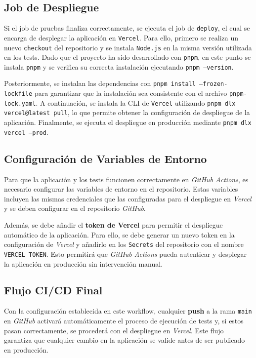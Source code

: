 \subsection*{Job de Despliegue}

Si el job de pruebas finaliza correctamente, se ejecuta el job de \texttt{deploy}, el cual se encarga de desplegar la aplicación en \texttt{Vercel}. Para ello, primero se realiza un nuevo \texttt{checkout} del repositorio y se instala \texttt{Node.js} en la misma versión utilizada en los tests. Dado que el proyecto ha sido desarrollado con \texttt{pnpm}, en este punto se instala \texttt{pnpm} y se verifica su correcta instalación ejecutando \texttt{pnpm --version}.

Posteriormente, se instalan las dependencias con \texttt{pnpm install --frozen-lockfile} para garantizar que la instalación sea consistente con el archivo \texttt{pnpm-lock.yaml}. A continuación, se instala la CLI de \texttt{Vercel} utilizando \texttt{pnpm dlx vercel@latest pull}, lo que permite obtener la configuración de despliegue de la aplicación. Finalmente, se ejecuta el despliegue en producción mediante \texttt{pnpm dlx vercel --prod}.

\subsection{Configuración de Variables de Entorno}

Para que la aplicación y los tests funcionen correctamente en \textit{GitHub Actions}, es necesario configurar las variables de entorno en el repositorio. Estas variables incluyen las mismas credenciales que las configuradas para el despliegue en \textit{Vercel} y se deben configurar en el repositorio \textit{GitHub}.

Además, se debe añadir el \textbf{token de Vercel} para permitir el despliegue automático de la aplicación. Para ello, se debe generar un nuevo token en la configuración de \textit{Vercel} y añadirlo en los \texttt{Secrets} del repositorio con el nombre \texttt{VERCEL\_TOKEN}. Esto permitirá que \textit{GitHub Actions} pueda autenticar y desplegar la aplicación en producción sin intervención manual.

\subsection{Flujo CI/CD Final}

Con la configuración establecida en este workflow, cualquier \textbf{push} a la rama \texttt{main} en \textit{GitHub} activará automáticamente el proceso de ejecución de tests y, si estos pasan correctamente, se procederá con el despliegue en \textit{Vercel}. Este flujo garantiza que cualquier cambio en la aplicación se valide antes de ser publicado en producción.

